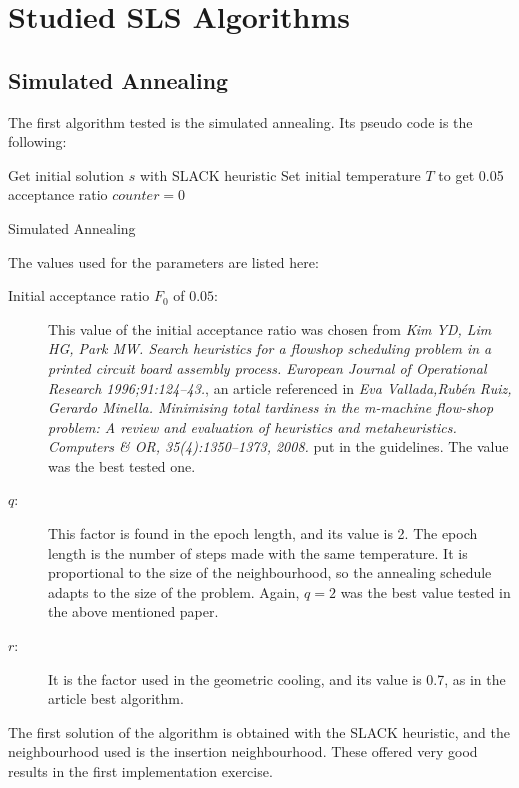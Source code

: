 \section{Studied SLS Algorithms}
\subsection{Simulated Annealing}
The first algorithm tested is the simulated annealing. Its pseudo code is the following:

\begin{algorithm}[H]
 Get initial solution $s$ with SLACK heuristic\;
 Set initial temperature $T$ to get 0.05 acceptance ratio\;
 $counter = 0$\;
 \caption{Simulated Annealing}
\end{algorithm}

The values used for the parameters are listed here:
\begin{description}
\item[Initial acceptance ratio $F_0$ of $0.05$:] This value of the initial acceptance ratio was chosen from \emph{Kim YD, Lim HG, Park MW. Search heuristics for a flowshop scheduling problem in a printed circuit board assembly process. European Journal
of Operational Research 1996;91:124–43.}, an article referenced in \emph{Eva Vallada,Rubén Ruiz, Gerardo Minella. Minimising total tardiness in the m-machine flow-shop problem: A review and evaluation of heuristics and metaheuristics. Computers \& OR, 35(4):1350–1373, 2008.} put in the guidelines. The value was the best tested one.

\item[$q$:] This factor is found in the epoch length, and its value is 2. The epoch length is the number of steps made with the same temperature. It is proportional to the size of the neighbourhood, so the annealing schedule adapts to the size of the problem. Again, $q = 2$ was the best value tested in the above mentioned paper.

\item[$r$:] It is the factor used in the geometric cooling, and its value is 0.7, as in the article best algorithm.
\end{description}

The first solution of the algorithm is obtained with the SLACK heuristic, and the neighbourhood used is the insertion neighbourhood. These offered very good results in the first implementation exercise.\\

